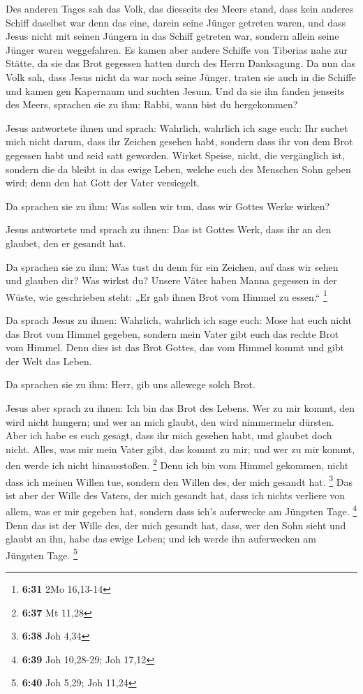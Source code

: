  Des anderen Tages sah das Volk, das diesseits des Meers
stand, dass kein anderes Schiff daselbst war denn das eine, darein seine
Jünger getreten waren, und dass Jesus nicht mit seinen Jüngern in das
Schiff getreten war, sondern allein seine Jünger waren weggefahren.
 Es kamen aber andere Schiffe von Tiberias nahe zur Stätte,
da sie das Brot gegessen hatten durch des Herrn Danksagung.
 Da nun das Volk sah, dass Jesus nicht da war noch seine
Jünger, traten sie auch in die Schiffe und kamen gen Kapernaum und
suchten Jesum.  Und da sie ihn fanden jenseits des Meers,
sprachen sie zu ihm: Rabbi, wann bist du hergekommen?

 Jesus antwortete ihnen und sprach: Wahrlich, wahrlich ich
sage euch: Ihr suchet mich nicht darum, dass ihr Zeichen gesehen habt,
sondern dass ihr von dem Brot gegessen habt und seid satt geworden.
 Wirket Speise, nicht, die vergänglich ist, sondern die da
bleibt in das ewige Leben, welche euch des Menschen Sohn geben wird;
denn den hat Gott der Vater versiegelt.

 Da sprachen sie zu ihm: Was sollen wir tun, dass wir
Gottes Werke wirken?

 Jesus antwortete und sprach zu ihnen: Das ist Gottes Werk,
dass ihr an den glaubet, den er gesandt hat.

 Da sprachen sie zu ihm: Was tust du denn für ein Zeichen,
auf dass wir sehen und glauben dir? Was wirkst du?  Unsere
Väter haben Manna gegessen in der Wüste, wie geschrieben steht: „Er gab
ihnen Brot vom Himmel zu essen.`` \footnote{\textbf{6:31} 2Mo 16,13-14}

 Da sprach Jesus zu ihnen: Wahrlich, wahrlich ich sage
euch: Mose hat euch nicht das Brot vom Himmel gegeben, sondern mein
Vater gibt euch das rechte Brot vom Himmel.  Denn dies ist
das Brot Gottes, das vom Himmel kommt und gibt der Welt das Leben.

 Da sprachen sie zu ihm: Herr, gib uns allewege solch Brot.

 Jesus aber sprach zu ihnen: Ich bin das Brot des Lebens.
Wer zu mir kommt, den wird nicht hungern; und wer an mich glaubt, den
wird nimmermehr dürsten.  Aber ich habe es euch gesagt,
dass ihr mich gesehen habt, und glaubet doch nicht.  Alles,
was mir mein Vater gibt, das kommt zu mir; und wer zu mir kommt, den
werde ich nicht hinausstoßen. \footnote{\textbf{6:37} Mt 11,28}
 Denn ich bin vom Himmel gekommen, nicht dass ich meinen
Willen tue, sondern den Willen des, der mich gesandt hat. \footnote{\textbf{6:38}
  Joh 4,34}  Das ist aber der Wille des Vaters, der mich
gesandt hat, dass ich nichts verliere von allem, was er mir gegeben hat,
sondern dass ich's auferwecke am Jüngsten Tage. \footnote{\textbf{6:39}
  Joh 10,28-29; Joh 17,12}  Denn das ist der Wille des, der
mich gesandt hat, dass, wer den Sohn sieht und glaubt an ihn, habe das
ewige Leben; und ich werde ihn auferwecken am Jüngsten Tage. \footnote{\textbf{6:40}
  Joh 5,29; Joh 11,24}

